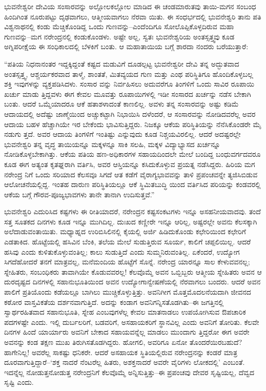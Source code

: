 ಭುವನೇಶ್ವರೀ ದೇವಿಯ ಸಂಸಾರವನ್ನು ಅಲ್ಲೋಲಕಲ್ಲೋಲ ಮಾಡಿದ ಈ ಚಂಡಮಾರುತವು ತಾಯಿ-ಮಗನ ಸಂಬಂಧ ಹಿಂದಿಗಿಂತ ನೂರುಪಟ್ಟು ದೃಢವಾಗಲು, ಆತ್ಮೀಯವಾಗಲು ನೆರವಾ ಯಿತು. ಈ ಸಂಧರ್ಭದಲ್ಲಿ ಭುವನೇಶ್ವರಿ ತಾನು ಪತಿ ವಿಶ್ವನಾಥನಲ್ಲಿ ಕಂಡು ಮೆಚ್ಚಿಕೊಂಡಿದ್ದ ಒಂದು ಗುಣವನ್ನು–ಎಂದೆಂದಿಗೂ ಸೋಲೊಪ್ಪಿಕೊಳ್ಳದಿರುವ ಮಹಾ ಗುಣವನ್ನು–ಮಗ ನರೇಂದ್ರನಲ್ಲಿ ಕಂಡುಕೊಂಡಳು. ಅಷ್ಟೇ ಅಲ್ಲ, ಸ್ವತಃ ಭುವನೇಶ್ವರಿಯ ಅಂತಸ್ಸತ್ತ್ವವು ಕೂಡ ಅಗ್ನಿಪರೀಕ್ಷೆಯ ಈ ಸಂಧಿಕಾಲದಲ್ಲಿ ಬೆಳಕಿಗೆ ಬಂತು. ಆ ಮಹಾತಾಯಿಯ ಬಗ್ಗೆ ಶಾರದಾ ನಂದರು ಬರೆಯುತ್ತಾರೆ:

“ಪತಿಯ ನಿಧನಾನಂತರ ಇದ್ದಕ್ಕಿದ್ದಂತೆ ಕಷ್ಟದ ಮಡುವಿಗೆ ದೂಡಲ್ಪಟ್ಟ ಭುವನೇಶ್ವರೀ ದೇವಿ ತನ್ನ ಅದ್ಭುತವಾದ ಅಂತಸ್ಸತ್ತ್ವ, ಆಶ್ಚರ್ಯಕರವಾದ ತಾಳ್ಮೆ, ಶಾಂತತೆ, ಮಿತವ್ಯಯದ ಗುಣ ಮತ್ತು ಎಂಥ ಪರಿಸ್ಥಿತಿಗೂ ಹೊಂದಿಕೊಳ್ಳಬಲ್ಲ ಶಕ್ತಿ ಇವುಗಳನ್ನು ವ್ಯಕ್ತಪಡಿಸಿದಳು. ಸಂಸಾರ ವನ್ನು ನಿರ್ವಹಿಸಲು ಅದುವರೆಗೂ ತಿಂಗಳಿಗೆ ಒಂದು ಸಾವಿರ ರೂಪಾಯಿ ಖರ್ಚು ಮಾಡು ತ್ತಿದ್ದವಳು ಈಗ ಕೇವಲ ಮೂವತ್ತು ರೂಪಾಯಿಗಳಲ್ಲಿ ಇಡೀ ಸಂಸಾರದ ಖರ್ಚನ್ನು ನಡೆಸ ಬೇಕಾಗಿ ಬಂತು. ಆದರೆ ಒಮ್ಮೆಯಾದರೂ ಆಕೆ ಹತಾಶಳಾದಂತೆ ಕಾಣಲಿಲ್ಲ. ಅವಳು ತನ್ನ ಸಂಸಾರವನ್ನು ಅಷ್ಟು ಕಡಿಮೆ ಆದಾಯದಲ್ಲಿ ಅದೆಷ್ಟು ಜಾಣ್ಮೆಯಿಂದ ಅಚ್ಚುಕಟ್ಟಾಗಿ ನಿಭಾಯಿಸಿ ದಳೆಂದರೆ, ಆ ಸಂಸಾರವನ್ನು ನೋಡಿದವರೆಲ್ಲ ಅವರ ಆದಾಯ ಬಹಳ ಹೆಚ್ಚಾಗಿಯೇ ಇರ ಬೇಕೆಂದು ಭಾವಿಸುತ್ತಿದ್ದರು. ನಿಜಕ್ಕೂ ಆಕೆಯ ಪರಿಸ್ಥಿತಿಯನ್ನು ನೆನೆಸಿಕೊಂಡರೇ ಮೈ ನಡುಗು ತ್ತದೆ. ಅವರ ಆದಾಯ ತಿಂಗಳಿಗೆ ಇಂತಿಷ್ಟು ಎನ್ನುವುದು ಕೂಡ ನಿಶ್ಚಯವಿರಲಿಲ್ಲ. ಆದರೆ ಅದಷ್ಟರಲ್ಲೇ ಭುವನೇಶ್ವರಿ ತನ್ನ ವೃದ್ಧ ತಾಯಿಯನ್ನೂ ಮಕ್ಕಳನ್ನೂ ಸಾಕಿ ಸಲಹಿ, ಮಕ್ಕಳ ವಿದ್ಯಾಭ್ಯಾಸದ ಖರ್ಚನ್ನೂ ನೋಡಿಕೊಳ್ಳಬೇಕಾಗಿತ್ತು. ಆಕೆಯ ಪತಿಯ ಹಣ-ಅಧಿಕಾರಗಳ ಸಹಾಯದಿಂದಲೇ ಮೇಲೆ ಬಂದಿದ್ದ ಬಂಧುವರ್ಗದವರೂ ಕೂಡ ಈಗ ಅತ್ಯಂತ ಕೃತಘ್ನರಾಗಿ ವರ್ತಿಸಿ, ಅವರ ಆಸ್ತಿಯನ್ನೂ ಕಸಿದುಕೊಳ್ಳುವ ಪ್ರಯತ್ನ ನಡೆಸಿದ್ದರು. ಹಿರಿಯ ಮಗ ನರೇಂದ್ರ ನಿಗೆ ಒಂದು ಸರಿಯಾದ ಕೆಲಸವೂ ಸಿಗದೆ ಆತ ಕಡೆಗೆ ವೈರಾಗ್ಯಭಾವವನ್ನು ತಾಳಿ ಪ್ರಪಂಚವನ್ನೇ ತ್ಯಜಿಸಿಬಿಡುವ ಆಲೋಚನೆಯಲ್ಲಿದ್ದ. ಇಂತಹ ದಾರುಣ ಪರಿಸ್ಥಿತಿಯಲ್ಲೂ ಆಕೆ ಸ್ಥಿಮಿತಬುದ್ಧಿ ಯಿಂದ ವರ್ತಿಸಿದ ಪರಿಯನ್ನು ಕಂಡವರಲ್ಲಿ ಆಕೆಯ ಬಗ್ಗೆ ಗೌರವ-ಪೂಜ್ಯಭಾವಗಳು ತಾನೇ ತಾನಾಗಿ ಉದಿಸುತ್ತವೆ.”

ಭುವನೇಶ್ವರಿ ಎದುರಿಸಿದ ಕಷ್ಟಗಳು ಈ ರೀತಿಯಾದರೆ, ನರೇಂದ್ರನ ಕಷ್ಟಸಂಕಟಗಳು ಇನ್ನೂ ಅಸಹನೀಯವಾದವು. ತಂದೆ ಸತ್ತ ಸೂತಕದ ದಿನಗಳು ಕೂಡ ಇನ್ನೂ ಮುಗಿದಿಲ್ಲ. ದುಃಖದ ಕಣ್ಣೀರೇ ಇನ್ನೂ ಆರಿಲ್ಲ, ಅಷ್ಟರಲ್ಲೇ ಅವನು ಕೆಲಸಕ್ಕಾಗಿ ಅಲೆದಾಡುವಂತಾಯಿತು. ಮಧ್ಯಾಹ್ನದ ಉರಿಬಿಸಿಲಿನಲ್ಲಿ ಕೈಯಲ್ಲಿ ಅರ್ಜಿ ಹಿಡಿದುಕೊಂಡು ಕಛೇರಿಯಿಂದ ಕಛೇರಿಗೆ ಎಡತಾಕಿದ. ಹೊಟ್ಟೆಯಲ್ಲಿ ಹಸಿವಿನ ಬೆಂಕಿ, ತಲೆಯ ಮೇಲೆ ಸುಡುತ್ತಿರುವ ಸೂರ್ಯ, ಕಾಲಿಗೆ ಚಪ್ಪಲಿಯಿಲ್ಲ. ಆದರೆ ಹಸಿವು ಎಂದು ಕುಳಿತುಕೊಳ್ಳುವಂತಿಲ್ಲ; ಕಾಲು ಸುಡುತ್ತಿದೆ ಎಂದು ಸುಮ್ಮನಿರುವಂತಿಲ್ಲ. ಏಕೆಂದರೆ, ಉದ್ಯೋಗ ಸಿಗದೆಹೋದರೆ ತನಗೆ ಮಾತ್ರವಲ್ಲ, ಮನೆಮಂದಿಯ ಹೊಟ್ಟೆಗೆ ಸೊನ್ನೆ. ನರೇಂದ್ರ ಯಾರನ್ನೂ ಸಾಲ ಕೇಳುವವನಲ್ಲ; ಸ್ನೇಹಿತರು, ಸಂಬಂಧಿಕರು ತಾವಾಗಿಯೇ ಕೊಡುವವರಲ್ಲ! ಕೆಲವೊಮ್ಮೆ ಅವನ ಒಬ್ಬಿಬ್ಬರು ಆತ್ಮೀಯ ಸ್ನೇಹಿತರು ಅವನ ಆ ದುರದೃಷ್ಟದ ದಿನಗಳಲ್ಲಿ ಸಹಾನುಭೂತಿಯಿಂದ ಅವನ ಉದ್ಯೋಗಾನ್ವೇಷಣೆಯಲ್ಲಿ ನೆರವಾಗಲು ಬಂದರು. ಆದರೆ ಅವನ ಪಾಲಿಗೆ ಪ್ರತಿಯೊಂದು ಕಡೆಯಲ್ಲೂ ಬಾಗಿಲು ಮುಚ್ಚಿಕೊಳ್ಳುತ್ತಿತ್ತು. ಅವನಿಗೀಗ ಮೊತ್ತಮೊದಲನೆಯದಾಗಿ ಜೀವನದ ಕಠೋರ ವಾಸ್ತವಿಕತೆಯ ದರ್ಶನವಾಗುತ್ತಿದೆ. ಅದನ್ನು ಕಂಡಾಗ ಅವನಿಗನ್ನಿಸತೊಡಗಿತು–ಈ ಜಗತ್ತಿನಲ್ಲಿ ಸ್ವಾರ್ಥರಹಿತವಾದ ಸಹಾನುಭೂತಿ, ಸ್ನೇಹ ಎಂಬವುಗಳೆಲ್ಲ ಕೇವಲ ಮಾತನಾಡಲು ಉಪಯೋಗಿಸುವ ಔಪಚಾರಿಕ ಪದಗಳಷ್ಟೇ ಎಂದು. ಇಲ್ಲಿ ದುರ್ಬಲರಿಗೆ, ಬಡವರಿಗೆ, ಅಸಹಾಯಕರಿಗೆ ಸ್ಥಾನವಿಲ್ಲ ಎಂದು ಅವನಿಗೆ ತೋರಿತು. ಕೆಲವೇ ದಿನಗಳ ಹಿಂದೆ ಯಾರ್ಯಾರು ಅವನಿಗೆ ಬೇಕಾದ ಸಹಾಯವನ್ನೆಲ್ಲ ಮಾಡಲು ಮುಂದಾಗು ತ್ತಿದ್ದರೋ ಈಗ ಅವರೇ ಅವನನ್ನು ಕಂಡ ತಕ್ಷಣ ಮುಖ ತಿರುಗಿಸತೊಡಗಿದ್ದರು. ಹೋಗಲಿ, ಅವರಿಗೂ ಏನೋ ತೊಂದರೆಯಿರಬಹುದೆ? ಹಾಗೇನಿಲ್ಲ! ಅವರೆಲ್ಲ ಸಾಕಷ್ಟು ಧನಿಕರೇ. ಆದರೆ ಅಸಹಾಯಕ ಸ್ಥಿತಿಯಲ್ಲಿರುವ ನರೇಂದ್ರನನ್ನು ಕಂಡರೆ ಮಾತ್ರ ದೂರವಾಗುತ್ತಿದ್ದಾರೆ–‘ಶಕ್ತ ನಾದರೆ ನೆಂಟರೆಲ್ಲ ಹಿತರು, ಅಶಕ್ತನಾದರೆ ಅವರೇ ವೈರಿಗಳು ಲೋಕದಲ್ಲಿ’ ಎಂಬಂತೆ. ಇದನ್ನೆಲ್ಲ ನೋಡುತ್ತನೋಡುತ್ತ ನರೇಂದ್ರನಿಗೆ ಕೆಲವೊಮ್ಮೆ ಅನ್ನಿಸುತ್ತಿತ್ತು–ಈ ಪ್ರಪಂಚವು ದೇವರ ಸೃಷ್ಟಿಯಲ್ಲ, ದೆವ್ವದ ಸೃಷ್ಟಿ ಎಂದು.

